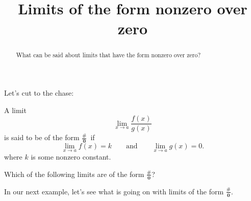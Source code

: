 \documentclass{ximera}
\title[Dig-In:]{Limits of the form nonzero over zero}
\begin{document}
\begin{abstract}
  What can be said about limits that have the form nonzero over zero?
\end{abstract}

\maketitle

Let's cut to the chase:

\begin{definition}
  A limit
  \[
  \lim_{x\to a} \frac{f(x)}{g(x)}
  \]
  is said to be of the form $\boldsymbol{\tfrac{\#}{0}}$\ if
  \[
  \lim_{x\to a} f(x) = k\qquad\text{and}\qquad \lim_{x\to a} g(x) =0.
  \]
  where $k$ is some nonzero constant.
\end{definition}

\begin{question}
  Which of the following limits are of the form $\boldsymbol{\tfrac{\#}{0}}$?
  \begin{selectAll}
  \end{selectAll}
\end{question}

In our next example, let's see what is going on with limits of the
form $\boldsymbol{\tfrac{\#}{0}}$.
\end{document}
